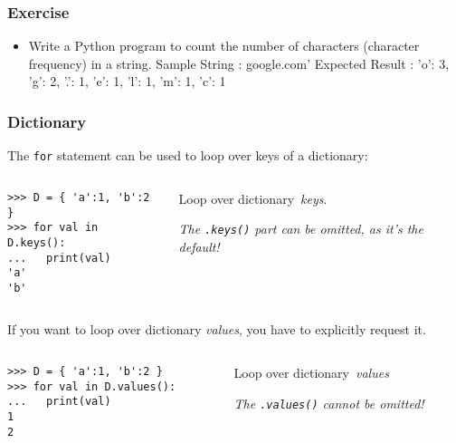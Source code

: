 \begin{frame}[fragile]\frametitle{Exercise}
\begin{itemize}
\item Write a Python program to count the number of characters (character frequency) in a string.
Sample String : google.com'
Expected Result : {'o': 3, 'g': 2, '.': 1, 'e': 1, 'l': 1, 'm': 1, 'c': 1}
\end{itemize}
\end{frame}


\begin{frame}[fragile]\frametitle{Dictionary}
  The \texttt{for} statement can be used to loop over keys of a dictionary:
  
  \begin{columns}[c]
    \begin{column}{0.5\linewidth}
\begin{lstlisting}
>>> D = { 'a':1, 'b':2 }
>>> for val in D.keys():
...   print(val)
'a'
'b'
\end{lstlisting}
    \end{column}
    \begin{column}{0.4\linewidth}
      \raggedleft
      Loop over dictionary~\emph{keys}.

      \emph{The \texttt{.keys()} part can be omitted, as it's the
        default!}
    \end{column}
  \end{columns}

  If you want to loop over dictionary \emph{values}, you have to explicitly request it.

  
  \begin{columns}[c]
    \begin{column}{0.5\linewidth}
\begin{lstlisting}
>>> D = { 'a':1, 'b':2 }
>>> for val in D.values():
...   print(val)
1
2
\end{lstlisting}
    \end{column}
    \begin{column}{0.4\linewidth}
      \raggedleft
      Loop over dictionary~\emph{values}

      \emph{The \texttt{.values()} cannot be omitted!}
    \end{column}
  \end{columns}
\end{frame}


